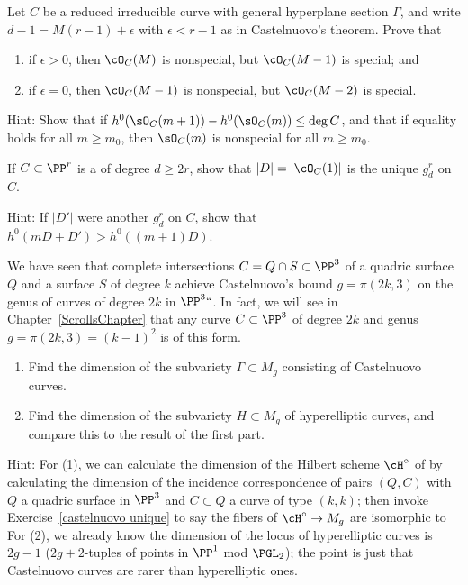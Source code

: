 \begin{exercise}
Let $C$ be a reduced irreducible curve with general hyperplane section
$\Gamma$,
and write
$d-1 = M(r-1) +\epsilon$ with $\epsilon<r-1$ as in Castelnuovo's theorem.
Prove that
\begin{enumerate}
\item if $\epsilon > 0$, then $\cO_C(M)$ is nonspecial, but $\cO_C(M-1)$
is special; and
\item if $\epsilon = 0$, then $\cO_C(M-1)$ is nonspecial, but $\cO_C(M-2)$
%
is special.
\end{enumerate}

Hint: Show that if $h^{0}(\sO_{C}(m+1))-h^{0}(\sO_{C}(m)) \leq \deg C$,
and that if equality holds for
all $m\geq m_{0}$, then $\sO_{C}(m) $ is nonspecial for all $m\geq m_{0}$.
\end{exercise}

\begin{exercise}\label{castelnuovo unique}
If $C \subset \PP^r$ is a 
%
of degree $d \geq 2r$,
show that $|D| = |\cO_C(1)|$ is the unique $g^r_d$ on $C$.

Hint: If $|D'|$ were another $g^r_d$ on $C$, show that $h^0(mD + D')
> h^0((m+1)D)$.
\end{exercise}


\begin{exercise}\label{rarity of Castelnuovo}
We have seen that complete intersections $C = Q \cap S \subset \PP^3$ of a
quadric surface $Q$ and a surface $S$ of degree $k$ achieve Castelnuovo's
bound $g = \pi(2k, 3)$ on the genus of curves of degree $2k$ in $\PP^3`
`$. In fact, we will see in Chapter~\ref{ScrollsChapter} that any curve
$C \subset \PP^3$ of degree $2k$ and genus $g = \pi(2k, 3) = (k-1)^2$
is of this form.
\begin{enumerate}
\item Find the dimension of the subvariety $\Gamma \subset M_g$ consisting
of Castelnuovo curves.
\item Find the dimension of the subvariety $H \subset M_g$ of
hyperelliptic curves, and compare this to the result of the first part.
\end{enumerate}

Hint: For 
(1), 
we can calculate the dimension of the Hilbert
scheme $\cH^\circ$ of 
%
by calculating the dimension
of the incidence correspondence of pairs $(Q, C)$ with $Q$ a quadric
surface in $\PP^3$ and $C \subset Q$ a curve of type $(k,k)$; then invoke
Exercise~\ref{castelnuovo unique} to say the fibers of $\cH^\circ \to
M_g$ are isomorphic to 
%
%
For 
(2), 
we already know the
dimension of the locus of hyperelliptic curves is $2g-1$ ($2g+2$-tuples
of points in $\PP^1$ mod $\PGL_2$); the point is just that Castelnuovo
curves are rarer than hyperelliptic ones.
\end{exercise}





